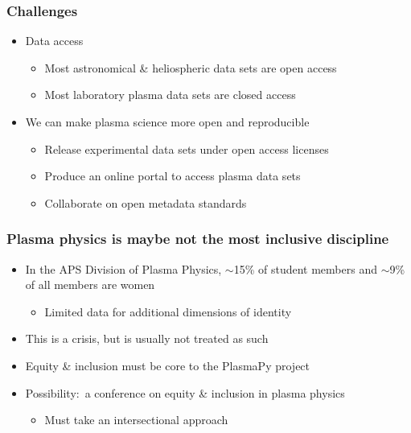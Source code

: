 \documentclass[default,compress]{beamer}
\begin{document}
\begin{frame}[plain]
    \frametitle{Challenges}
    \begin{itemize}
    \item Data access
        \begin{itemize}
        \item Most astronomical \& heliospheric data sets are open access
        \item Most laboratory plasma data sets are closed access
        \end{itemize}
    \item We can make plasma science more open and reproducible
        \begin{itemize}
        \item Release experimental data sets under open access licenses
        \item Produce an online portal to access plasma data sets
        \item Collaborate on open metadata standards
        \end{itemize}
    \end{itemize}
\end{frame}

\begin{frame}[plain]
    \frametitle{Plasma physics is maybe not the most inclusive discipline}
    \begin{itemize}
    \item In the APS Division of Plasma Physics, $\sim$15\% of student members and $\sim$9\% of all members are women
        \begin{itemize}
        \item Limited data for additional dimensions of identity
        \end{itemize}
    \item This is a crisis, but is usually not treated as such
    \item Equity \& inclusion must be core to the PlasmaPy project
    \item Possibility:\ a conference on equity \& inclusion in plasma physics
        \begin{itemize}
        \item Must take an intersectional approach
        \end{itemize}
    \end{itemize}
\end{frame}
\end{document}
